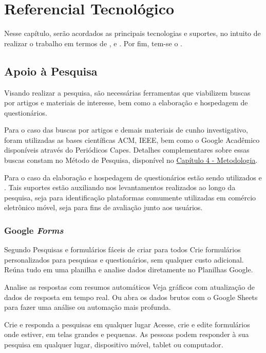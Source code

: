 \chapter[Referencial Tecnológico]{Referencial Tecnológico} 
\label{chap:reftec}

Nesse capítulo, serão acordados as principais tecnologias e suportes, no intuito de realizar o trabalho em termos de ,  e . Por fim, tem-se o .

\section{Apoio à Pesquisa} \label{pesquisa}

Visando realizar a pesquisa, são necessárias ferramentas que viabilizem buscas por artigos e materiais de interesse, bem como a elaboração e hospedagem de questionários. 

Para o caso das buscas por artigos e demais materiais de cunho investigativo, foram utilizadas as bases científicas ACM, IEEE, bem como o Google Acadêmico disponíveis através do Periódicos Capes. Detalhes complementares sobre essas buscas constam no Método de Pesquisa, disponível no \hyperref[chap:met]{Capítulo 4 - Metodologia}.

Para o caso da elaboração e hospedagem de questionários estão sendo utilizados  e . Tais suportes estão auxiliando nos levantamentos realizados ao longo da pesquisa, seja para identificação plataformas comumente utilizadas em comércio eletrônico móvel, seja para fins de avaliação junto aos usuários.

\subsection{Google \textit{Forms}}
\label{GoogleForms}

Segundo Pesquisas e formulários fáceis de criar para todos
Crie formulários personalizados para pesquisas e questionários, sem qualquer custo adicional. Reúna tudo em uma planilha e analise dados diretamente no Planilhas Google.

Analise as respostas com resumos automáticos
Veja gráficos com atualização de dados de resposta em tempo real. Ou abra os dados brutos com o Google Sheets para fazer uma análise ou automação mais profunda.

Crie e responda a pesquisas em qualquer lugar
Acesse, crie e edite formulários onde estiver, em telas grandes e pequenas. As pessoas podem responder à sua pesquisa em qualquer lugar, dispositivo móvel, tablet ou computador.

